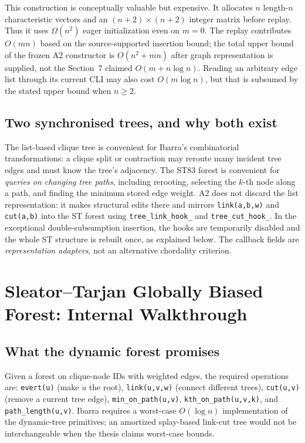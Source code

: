This construction is conceptually valuable but expensive.  It allocates \(n\) length-\(n\) characteristic vectors and an \((n+2)\times(n+2)\) integer matrix before replay.  Thus it uses \(\Omega(n^2)\) eager initialization even on \(m=0\).  The replay contributes \(O(mn)\) based on the source-supported insertion bound; the total upper bound of the frozen A2 constructor is \(O(n^2+mn)\) after graph representation is supplied, not the Section~7 claimed \(O(m+n\log n)\).  Reading an arbitrary edge list through its current CLI may also cost \(O(m\log n)\), but that is subsumed by the stated upper bound when \(n\ge2\).

\subsection{Two synchronised trees, and why both exist}
The list-based clique tree is convenient for Ibarra's combinatorial transformations: a clique split or contraction may reroute many incident tree edges and must know the tree's adjacency.  The ST83 forest is convenient for \emph{queries on changing tree paths}, including rerooting, selecting the \(k\)-th node along a path, and finding the minimum stored edge weight.  A2 does not discard the list representation: it makes structural edits there and mirrors \texttt{link(a,b,w)} and \texttt{cut(a,b)} into the ST forest using \texttt{tree\_link\_hook\_} and \texttt{tree\_cut\_hook\_}.  In the exceptional double-subsumption insertion, the hooks are temporarily disabled and the whole ST structure is rebuilt once, as explained below.  The callback fields are \emph{representation adapters}, not an alternative chordality criterion.

\section{Sleator--Tarjan Globally Biased Forest: Internal Walkthrough}
\label{sec:st-full}
\subsection{What the dynamic forest promises}
Given a forest on clique-node IDs with weighted edges, the required operations are: \texttt{evert(u)} (make \(u\) the root), \texttt{link(u,v,w)} (connect different trees), \texttt{cut(u,v)} (remove a current tree edge), \texttt{min\_on\_path(u,v)}, \texttt{kth\_on\_path(u,v,k)}, and \texttt{path\_length(u,v)}.  Ibarra requires a worst-case \(O(\log n)\) implementation of the dynamic-tree primitives; an amortized splay-based link-cut tree would not be interchangeable when the thesis claims worst-case bounds.

